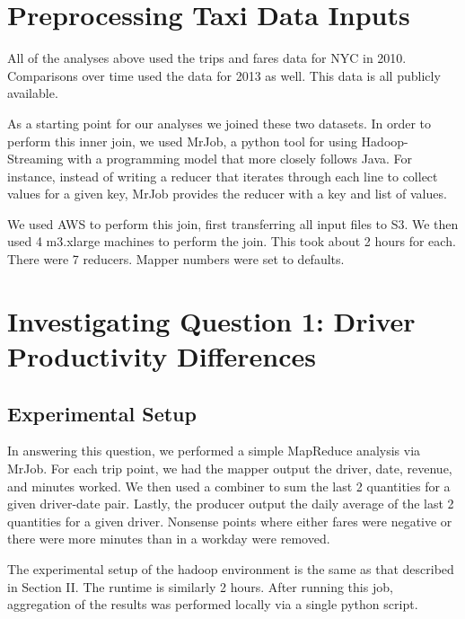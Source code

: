 \documentclass[twoside]{article}
\begin{document}
\begin{multicols}{2}
\section{Preprocessing Taxi Data Inputs}

All of the analyses above used the trips and fares data for NYC in 2010. Comparisons over time used the data for 2013 as well. This data is all publicly available. \cite{NYC_DATA}

As a starting point for our analyses we joined these two datasets. In order to perform this inner join, we used MrJob, a python tool for using Hadoop-Streaming with a programming model that more closely follows Java.\cite{MRJOB}  For instance, instead of writing a reducer that iterates through each line to collect values for a given key, MrJob provides the reducer with a key and list of values. 

We used AWS to perform this join, first transferring all input files to S3. We then used 4 m3.xlarge machines to perform the join. This took about 2 hours for each. There were 7 reducers. Mapper numbers were set to defaults. 


\section{Investigating Question 1: Driver Productivity Differences}

\subsection{Experimental Setup}
In answering this question, we performed a simple MapReduce analysis via MrJob. For each trip point, we had the mapper output the driver, date, revenue, and minutes worked. We then used a combiner to sum the last 2 quantities for a given driver-date pair.  Lastly, the producer output the daily average of the last 2 quantities for a given driver. Nonsense points where either fares were negative or there were more minutes than in a workday were removed. 

The experimental setup of the hadoop environment is the same as that described in Section II. The runtime is similarly 2 hours. After running this job, aggregation of the results was performed locally via a single python script.


\end{multicols}
\end{document}
